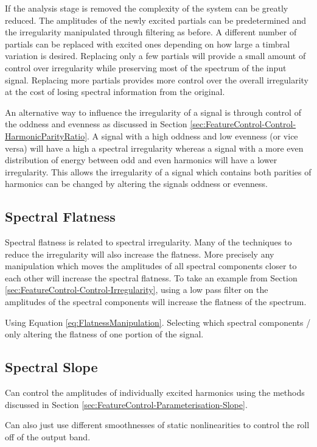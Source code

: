 		If the analysis stage is removed the complexity of the system can be greatly reduced. The amplitudes of the
		newly excited partials can be predetermined and the irregularity manipulated through filtering as before.
		A different number of partials can be replaced with excited ones depending on how large a timbral variation
		is desired. Replacing only a few partials will provide a small amount of control over irregularity while
		preserving most of the spectrum of the input signal. Replacing more partials provides more control over the
		overall irregularity at the cost of losing spectral information from the original.

		An alternative way to influence the irregularity of a signal is through control of the oddness and evenness
		as discussed in Section \ref{sec:FeatureControl-Control-HarmonicParityRatio}. A signal with a high oddness
		and low evenness (or vice versa) will have a high a spectral irregularity whereas a signal with a more even
		distribution of energy between odd and even harmonics will have a lower irregularity. This allows the
		irregularity of a signal which contains both parities of harmonics can be changed by altering the signals
		oddness or evenness.

	\subsection{Spectral Flatness}
	\label{sec:FeatureControl-Control-Flatness}
		Spectral flatness is related to spectral irregularity. Many of the techniques to reduce the irregularity
		will also increase the flatness. More precisely any manipulation which moves the amplitudes of all spectral
		components closer to each other will increase the spectral flatness. To take an example from Section
		\ref{sec:FeatureControl-Control-Irregularity}, using a low pass filter on the amplitudes of the spectral
		components will increase the flatness of the spectrum.

		\note
		{
			Using Equation \ref{eq:FlatnessManipulation}. Selecting which spectral components / only altering
			the flatness of one portion of the signal.
		}

	\subsection{Spectral Slope}
	\label{sec:FeatureControl-Control-Slope}
		\note
		{
			Can control the amplitudes of individually excited harmonics using the methods discussed in Section
			\ref{sec:FeatureControl-Parameterisation-Slope}.

			Can also just use different smoothnesses of static nonlinearities to control the roll off of the
			output band.
		}
